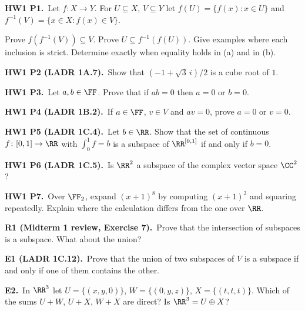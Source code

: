 \documentclass[10pt]{scrartcl}
\begin{document}
\begin{prob}\textbf{HW1 P1.}\ Let $f\colon X\to Y$. For $U\subseteq X$, $V\subseteq Y$ let $f(U)=\{f(x):x\in U\}$ and $f^{-1}(V)=\{x\in X:f(x)\in V\}$.
\begin{enumerate}[(a)]
  \ii Prove $f(f^{-1}(V))\subseteq V$. \ii Prove $U\subseteq f^{-1}(f(U))$.
  \ii Give examples where each inclusion is strict. Determine exactly when equality holds in (a) and in (b).
\end{enumerate}

\end{prob}
\begin{prob}\textbf{HW1 P2 (LADR 1A.7).}\ Show that $(-1+\sqrt3\,i)/2$ is a cube root of $1$.


\end{prob}
\begin{prob}\textbf{HW1 P3.}\ Let $a,b\in\FF$. Prove that if $ab=0$ then $a=0$ or $b=0$.


\end{prob}
\begin{prob}\textbf{HW1 P4 (LADR 1B.2).}\ If $a\in\FF$, $v\in V$ and $av=0$, prove $a=0$ or $v=0$.


\end{prob}
\begin{prob}\textbf{HW1 P5 (LADR 1C.4).}\ Let $b\in\RR$. Show that the set of continuous $f\colon[0,1]\to\RR$ with $\int_0^1f=b$ is a subspace of $\RR^{[0,1]}$ if and only if $b=0$.


\end{prob}
\begin{prob}\textbf{HW1 P6 (LADR 1C.5).}\ Is $\RR^2$ a subspace of the complex vector space $\CC^2$?


\end{prob}
\begin{prob}\textbf{HW1 P7.}\ Over $\FF_2$, expand $(x+1)^8$ by computing $(x+1)^2$ and squaring repeatedly. Explain where the calculation differs from the one over $\RR$.


\end{prob}
\begin{prob}\textbf{R1 (Midterm 1 review, Exercise 7).}\ Prove that the intersection of subspaces is a subspace. What about the union?
\end{prob}
\begin{prob}\textbf{E1 (LADR 1C.12).}\ Prove that the union of two subspaces of $V$ is a subspace if and only if one of them contains the other.
\end{prob}
\begin{prob}\textbf{E2.}\ In $\RR^3$ let $U=\{(x,y,0)\}$, $W=\{(0,y,z)\}$, $X=\{(t,t,t)\}$. Which of the sums $U+W$, $U+X$, $W+X$ are direct? Is $\RR^3=U\oplus X$?
\end{prob}
\end{document}
